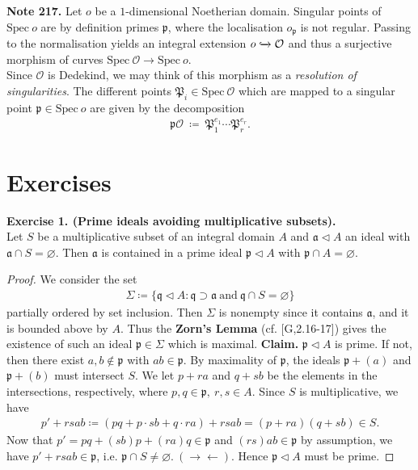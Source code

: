\documentclass[12pt,a4paper,footinclude=true,headinclude=true]{scrbook} %
\newenvironment{nt}[2][Note]
    { \begin{mdframed}[backgroundcolor=gray!20] \textbf{#1 #2.} }
    {  \end{mdframed}}
\newenvironment{exe}[2][Exercise]
    { \begin{mdframed}[backgroundcolor=gray!20] \textbf{#1 #2.}\\ }
    {  \end{mdframed}}
\begin{document}
\begin{nt}{217}
    Let $o$ be a $1$-dimensional Noetherian domain. Singular points of $\mathrm{Spec}\ o$ are by definition primes $\mathfrak{p}$, where the localisation $o_\mathfrak{p}$ is not regular. Passing to the normalisation yields an integral extension $o\xhookrightarrow{} \mathcal{O}$ and thus a surjective morphism of curves $\mathrm{Spec}\ \mathcal{O}\to\mathrm{Spec}\ o$. \\
    Since $\mathcal{O}$ is Dedekind, we may think of this morphism as a \textit{resolution of singularities}. The different points $\mathfrak{P}_i\in\mathrm{Spec}\ \mathcal{O}$ which are mapped to a singular point $\mathfrak{p}\in\mathrm{Spec}\ o$ are given by the decomposition
    \begin{align*}
        \mathfrak{p}\mathcal{O}\ \coloneqq\ \mathfrak{P}_1^{e_1}\cdots\mathfrak{P}_r^{e_r}.
    \end{align*}
\end{nt}

\newpage

\section{Exercises}
\begin{exe}{1. (Prime ideals avoiding multiplicative subsets)}
    Let $S$ be a multiplicative subset of an integral domain $A$ and $\mathfrak{a}\triangleleft A$ an ideal with $\mathfrak{a}\cap S=\varnothing$. Then $\mathfrak{a}$ is contained in a prime ideal $\mathfrak{p}\triangleleft A$ with $\mathfrak{p}\cap A=\varnothing$.
\end{exe}
\begin{proof}
    We consider the set 
    \begin{align*}
        \Sigma\coloneqq\{\mathfrak{q}\triangleleft A:\mathfrak{q}\supset\mathfrak{a}\ \text{and}\ \mathfrak{q}\cap S=\varnothing\}
    \end{align*}
    partially ordered by set inclusion. Then $\Sigma$ is nonempty since it contains $\mathfrak{a}$, and it is bounded above by $A$. Thus the \textbf{Zorn's Lemma} (cf. [G,2.16-17]) gives the existence of such an ideal $\mathfrak{p}\in\Sigma$ which is maximal. 
    \textbf{Claim.} $\mathfrak{p}\triangleleft A$ is prime. If not, then there exist $a,b\notin\mathfrak{p}$ with $ab\in\mathfrak{p}$. By maximality of $\mathfrak{p}$, the ideals $\mathfrak{p}+(a)$ and $\mathfrak{p}+(b)$ must intersect $S$. We let $p+ra$ and $q+sb$ be the elements in the intersections, respectively, where $p,q\in\mathfrak{p},\ r,s\in A$. Since $S$ is multiplicative, we have
    \begin{align*}
        p'+rsab\coloneqq(pq+p\cdot sb+q\cdot ra)+rsab=(p+ra)(q+sb)\in S.
    \end{align*}
    Now that $p'=pq+(sb)p+(ra)q\in\mathfrak{p}$ and $(rs)ab\in\mathfrak{p}$ by assumption, we have $p'+rsab\in\mathfrak{p}$, i.e. $\mathfrak{p}\cap S\neq\varnothing.\ (\to\gets)$. Hence $\mathfrak{p}\triangleleft A$ must be prime.
\end{proof}
\end{document}
